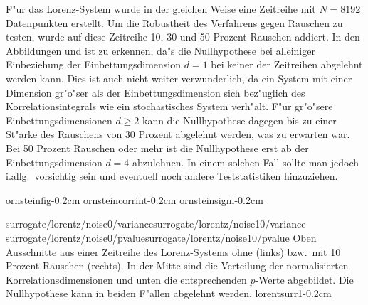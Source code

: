 F"ur das Lorenz-System wurde in der gleichen Weise eine Zeitreihe mit $N=8192$
Datenpunkten erstellt. Um die Robustheit des Verfahrens gegen Rauschen zu testen, wurde
auf diese Zeitreihe 10, 30 und 50 Prozent Rauschen addiert. In den Abbildungen
 und  ist zu erkennen, da"s die Nullhypothese bei
alleiniger Einbeziehung  der Einbettungsdimension $d=1$ bei keiner der Zeitreihen abgelehnt werden
kann. Dies ist auch nicht weiter verwunderlich, da ein System mit einer Dimension gr"o"ser 
als der Einbettungsdimension sich bez"uglich des Korrelationsintegrals wie ein
stochastisches System verh"alt. F"ur gr"o"sere Einbettungsdimensionen $d\geq2$ kann die
Nullhypothese dagegen bis zu einer St"arke des Rauschens von 30 Prozent abgelehnt werden,
was zu erwarten war. Bei 50 Prozent Rauschen oder mehr ist die Nullhypothese erst ab der
Einbettungsdimension $d=4$ abzulehnen. In einem solchen Fall sollte man jedoch i.allg.\   vorsichtig sein und
eventuell noch andere Teststatistiken hinzuziehen.

\clearpage
{
\def\psposmode{\psseparate}
{ornsteinfig}{-0.2cm}
{ornsteincorrint}{-0.2cm}
{ornsteinsigni}{-0.2cm}
}


{surrogate/lorentz/noise0/variance}{surrogate/lorentz/noise10/variance}
{surrogate/lorentz/noise0/pvalue}{surrogate/lorentz/noise10/pvalue}
{Oben Ausschnitte aus einer Zeitreihe des Lorenz-Systems ohne (links) bzw.\  mit 10 Prozent
  Rauschen (rechts). In der Mitte sind die Verteilung der normalisierten
  Korrelationsdimensionen und unten die entsprechenden $p$-Werte abgebildet. Die
  Nullhypothese kann in beiden F"allen abgelehnt werden.
}{lorentsurr1}{-0.2cm}


